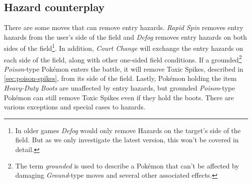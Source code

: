 \subsection{Hazard counterplay}
There are some moves that can remove entry hazards. \textit{Rapid Spin} 
\cite{Bulbapedia:RapidSpin} removes entry hazards from the user's side of the field and
\textit{Defog}\cite{Bulbapedia:Defog} removes entry hazards on both sides of the 
field\footnote{In older games \textit{Defog} would only remove Hazards on the
target's side of the field. But as we only investigate the latest version, this
won't be covered in detail.}. In addition, 
\textit{Court Change}\cite{Bulbapedia:CourtChange} will exchange the entry hazards
on each side of the field, along with other one-sided field conditions.
If a grounded\footnote{The term \textit{grounded} is used to describe a Pokémon that
can't be affected by damaging \textit{Ground}-type moves and several other associated 
effects\cite{Bulbapedia:Grounded}.}
\textit{Poison}-type Pokémon enters the battle, it will remove Toxic 
Spikes, described in \ref{sec:poison-spikes}, from its side of the field.
Lastly, Pokémon holding the item 
\textit{Heavy-Duty Boots}\cite{Bulbapedia:HeavyDutyBoots} are unaffected by
entry hazards, but grounded \textit{Poison}-type Pokémon can still remove
Toxic Spikes even if they hold the boots\cite{Bulbapedia:EntryHazards}.
There are various exceptions and special cases to hazards. 
